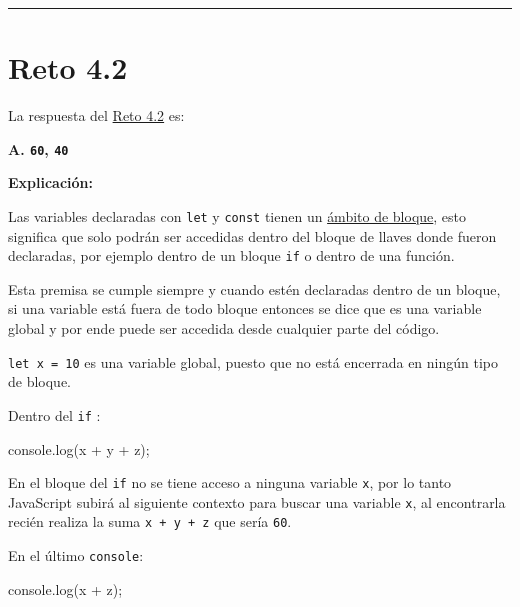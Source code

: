 \documentclass[
  letterpaper,
  DIV=11,
  numbers=noendperiod]{scrreprt}
\newenvironment{Shaded}{\begin{snugshade}}{\end{snugshade}}
\newcommand{\BuiltInTok}[1]{\textcolor[rgb]{0.00,0.23,0.31}{#1}}
\newcommand{\FunctionTok}[1]{\textcolor[rgb]{0.28,0.35,0.67}{#1}}
\newcommand{\NormalTok}[1]{\textcolor[rgb]{0.00,0.23,0.31}{#1}}
\newcommand{\OperatorTok}[1]{\textcolor[rgb]{0.37,0.37,0.37}{#1}}
\begin{document}
\begin{center}\rule{0.5\linewidth}{0.5pt}\end{center}

\section{Reto 4.2}\label{sec-sol-cap4-reto2}

La respuesta del \hyperref[sec-cap4-reto2]{Reto 4.2} es:

\textbf{A. \texttt{60}, \texttt{40}}

\textbf{Explicación:}

Las variables declaradas con \texttt{let} y \texttt{const} tienen un
\hyperref[glos-ambito_de_bloque]{ámbito de bloque}, esto significa que
solo podrán ser accedidas dentro del bloque de llaves donde fueron
declaradas, por ejemplo dentro de un bloque \texttt{if} o dentro de una
función.

Esta premisa se cumple siempre y cuando estén declaradas dentro de un
bloque, si una variable está fuera de todo bloque entonces se dice que
es una variable global y por ende puede ser accedida desde cualquier
parte del código.

\texttt{let\ x\ =\ 10} es una variable global, puesto que no está
encerrada en ningún tipo de bloque.

Dentro del \texttt{if} :

\begin{Shaded}
\begin{Highlighting}[]
\BuiltInTok{console}\OperatorTok{.}\FunctionTok{log}\NormalTok{(x }\OperatorTok{+}\NormalTok{ y }\OperatorTok{+}\NormalTok{ z)}\OperatorTok{;}
\end{Highlighting}
\end{Shaded}

En el bloque del \texttt{if} no se tiene acceso a ninguna variable
\texttt{x}, por lo tanto JavaScript subirá al siguiente contexto para
buscar una variable \texttt{x}, al encontrarla recién realiza la suma
\texttt{x\ +\ y\ +\ z} que sería \texttt{60}.

En el último \texttt{console}:

\begin{Shaded}
\begin{Highlighting}[]
\BuiltInTok{console}\OperatorTok{.}\FunctionTok{log}\NormalTok{(x }\OperatorTok{+}\NormalTok{ z)}\OperatorTok{;}
\end{Highlighting}
\end{Shaded}
\end{document}
